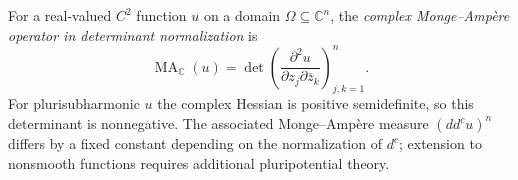 
For a real-valued $C^2$ function $u$ on a domain $\Omega\subseteq\mathbb C^n$, the \emph{complex Monge--Ampère operator in determinant normalization} is
\[
\operatorname{MA}_{\mathbb C}(u)=\det\left(\frac{\partial^2u}{\partial z_j\partial\overline z_k}\right)_{j,k=1}^{n}.
\]
For plurisubharmonic $u$ the complex Hessian is positive semidefinite, so this determinant is nonnegative. The associated Monge--Ampère measure $(dd^c u)^n$ differs by a fixed constant depending on the normalization of $d^c$; extension to nonsmooth functions requires additional pluripotential theory.
